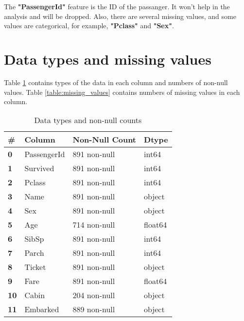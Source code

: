 The \textbf{"PassengerId"} feature is the ID of the passanger. It won't 
help in the analysis and will be dropped. Also, there are several missing 
values, and some values are categorical, for example, \textbf{"Pclass"}
and \textbf{"Sex"}.


\section{Data types and missing values}
Table \ref{table:dtypes} contains types of the data in each column and
numbers of non-null values. Table \ref{table:missing_values} contains 
numbers of missing values in each column.

\begin{table}[!ht]
	\centering
	\caption{Data types and non-null counts}
	\begin{tabular}{|l|l|l|l|}
		\hline
		\textbf{\#} & \textbf{Column} & \textbf{Non-Null Count} & \textbf{Dtype} \\ \hline
		\textbf{0}  & PassengerId     & 891 non-null            & int64          \\ \hline
		\textbf{1}  & Survived        & 891 non-null            & int64          \\ \hline
		\textbf{2}  & Pclass          & 891 non-null            & int64          \\ \hline
		\textbf{3}  & Name            & 891 non-null            & object         \\ \hline
		\textbf{4}  & Sex             & 891 non-null            & object         \\ \hline
		\textbf{5}  & Age             & 714 non-null            & float64        \\ \hline
		\textbf{6}  & SibSp           & 891 non-null            & int64          \\ \hline
		\textbf{7}  & Parch           & 891 non-null            & int64          \\ \hline
		\textbf{8}  & Ticket          & 891 non-null            & object         \\ \hline
		\textbf{9}  & Fare            & 891 non-null            & float64        \\ \hline
		\textbf{10} & Cabin           & 204 non-null            & object         \\ \hline
		\textbf{11} & Embarked        & 889 non-null            & object         \\ \hline
	\end{tabular}
	\label{table:dtypes}
\end{table}

